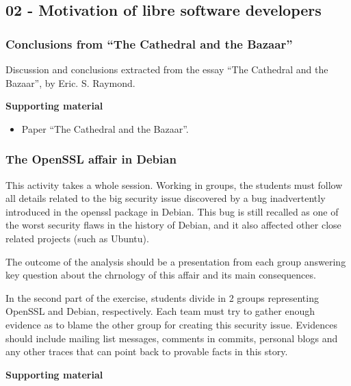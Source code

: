 \documentclass[a4paper]{article}
\begin{document}
\subsection{02 - Motivation of libre software developers}


\subsubsection{Conclusions from ``The Cathedral and the Bazaar''}

Discussion and conclusions extracted from the essay ``The Cathedral and the Bazaar'', by Eric. S. Raymond.

\textbf{Supporting material}

\begin{itemize}
\item Paper ``The Cathedral and the Bazaar''.
\end{itemize}

\subsubsection{The OpenSSL affair in Debian}
\label{sub:openssl-affair}

This activity takes a whole session. Working in groups, the students must follow all details related to the big security issue
discovered by a bug inadvertently introduced in the openssl package in Debian. This bug is still recalled as one of the worst security
flaws in the history of Debian, and it also affected other close related projects (such as Ubuntu).

The outcome of the analysis should be a presentation from each group answering key question about the chrnology of this affair and its
main consequences.

In the second part of the exercise, students divide in 2 groups representing OpenSSL and Debian, respectively. Each team must try to gather
enough evidence as to blame the other group for creating this security issue. Evidences should include mailing list messages, comments in
commits, personal blogs and any other traces that can point back to provable facts in this story.

\textbf{Supporting material}
\end{document}
